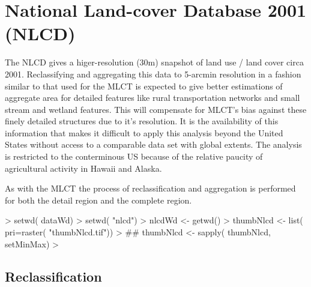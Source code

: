 \section{National Land-cover Database 2001 (NLCD)}
\label{sec:nlcd}

\citet{Homer2004}


The NLCD gives a higer-resolution (30m) snapshot of land use / land
cover circa 2001.    Reclassifying and aggregating this
data to 5-arcmin resolution in a fashion similar to that used for the
MLCT is expected to give better estimations of aggregate area for
detailed features like rural transportation networks and small stream
and wetland features.  This will compensate for MLCT's bias against
these finely detailed structures due to it's resolution.  It is the
availability of this information that makes it difficult to apply this
analysis beyond the United States without access to a comparable data
set with global extents.  The analysis is restricted to the
conterminous US because of the relative paucity of agricultural
activity in Hawaii and Alaska.

As with the MLCT the process of reclassification and aggregation is
performed for both the detail region and the complete region.

\begin{Schunk}
\begin{Sinput}
> setwd( dataWd)
> setwd( "nlcd")
> nlcdWd <- getwd()
> thumbNlcd <- list( pri=raster( "thumbNlcd.tif"))
> ## thumbNlcd <- sapply( thumbNlcd, setMinMax)
> 
\end{Sinput}
\end{Schunk}

\subsection{Reclassification}
\label{sec:nlcd-reclass}


\begin{Schunk}
\end{Schunk}

